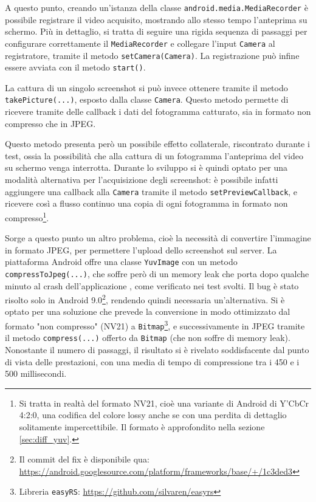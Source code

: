 A questo punto, creando un'istanza della classe \texttt{android.media.MediaRecorder} è possibile registrare il video acquisito, mostrando allo stesso tempo l'anteprima su schermo. Più in dettaglio, si tratta di seguire una rigida sequenza di passaggi\footnotemark{} per configurare correttamente il \texttt{MediaRecorder} e collegare l'input \texttt{Camera} al registratore, tramite il metodo \texttt{setCamera(Camera)}. La registrazione può infine essere avviata con il metodo \texttt{start()}.


La cattura di un singolo screenshot si può invece ottenere tramite il metodo \texttt{takePicture(...)}, esposto dalla classe \texttt{Camera}. Questo metodo permette di ricevere tramite delle callback i dati del fotogramma catturato, sia in formato non compresso che in JPEG.

Questo metodo presenta però un possibile effetto collaterale, riscontrato durante i test, ossia la possibilità che alla cattura di un fotogramma l'anteprima del video su schermo venga interrotta. Durante lo sviluppo si è quindi optato per una modalità alternativa per l'acquisizione degli screenshot: è possibile infatti aggiungere una callback alla \texttt{Camera} tramite il metodo \texttt{setPreviewCallback}, e ricevere così a flusso continuo una copia di ogni fotogramma in formato non compresso\footnote{Si tratta in realtà del formato NV21, cioè una variante di Android di Y'CbCr 4:2:0, una codifica del colore lossy anche se con una perdita di dettaglio solitamente impercettibile. Il formato è approfondito nella sezione \ref{sec:diff_yuv}.}.

Sorge a questo punto un altro problema, cioè la necessità di convertire l'immagine in formato JPEG, per permettere l'upload dello screenshot sul server. La piattaforma Android offre una classe \texttt{YuvImage} con un metodo \texttt{compressToJpeg(...)}, che soffre però di un memory leak che porta dopo qualche minuto al crash dell'applicazione \cite{memoryleak}, come verificato nei test svolti. Il bug è stato risolto solo in Android 9.0\footnote{Il commit del fix è disponibile qua: \url{https://android.googlesource.com/platform/frameworks/base/+/1c3ded3}}, rendendo quindi necessaria un'alternativa. Si è optato per una soluzione che prevede la conversione in modo ottimizzato dal formato "non compresso" (NV21) a \texttt{Bitmap}\footnote{Libreria \texttt{easyRS}: \url{https://github.com/silvaren/easyrs}}, e successivamente in JPEG tramite il metodo \texttt{compress(...)} offerto da \texttt{Bitmap} (che non soffre di memory leak). Nonostante il numero di passaggi, il risultato si è rivelato soddisfacente dal punto di vista delle prestazioni, con una media di tempo di compressione tra i 450 e i 500 millisecondi.


